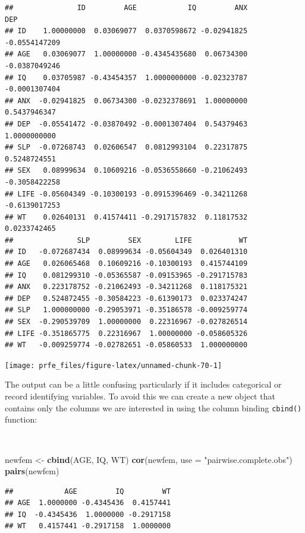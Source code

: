 \documentclass[12pt,a4paper]{book}
\newenvironment{Shaded}{\begin{snugshade}}{\end{snugshade}}
\newcommand{\KeywordTok}[1]{\textcolor[rgb]{0.13,0.29,0.53}{\textbf{#1}}}
\newcommand{\DataTypeTok}[1]{\textcolor[rgb]{0.13,0.29,0.53}{#1}}
\newcommand{\StringTok}[1]{\textcolor[rgb]{0.31,0.60,0.02}{#1}}
\newcommand{\NormalTok}[1]{#1}
\theoremstyle{definition}
\theoremstyle{definition}
\theoremstyle{definition}
\theoremstyle{remark}
\begin{document}
\begin{verbatim}
##               ID         AGE            IQ         ANX           DEP
## ID    1.00000000  0.03069077  0.0370598672 -0.02941825 -0.0554147209
## AGE   0.03069077  1.00000000 -0.4345435680  0.06734300 -0.0387049246
## IQ    0.03705987 -0.43454357  1.0000000000 -0.02323787 -0.0001307404
## ANX  -0.02941825  0.06734300 -0.0232378691  1.00000000  0.5437946347
## DEP  -0.05541472 -0.03870492 -0.0001307404  0.54379463  1.0000000000
## SLP  -0.07268743  0.02606547  0.0812993104  0.22317875  0.5248724551
## SEX   0.08999634  0.10609216 -0.0536558660 -0.21062493 -0.3058422258
## LIFE -0.05604349 -0.10300193 -0.0915396469 -0.34211268 -0.6139017253
## WT    0.02640131  0.41574411 -0.2917157832  0.11817532  0.0233742465
##               SLP         SEX        LIFE           WT
## ID   -0.072687434  0.08999634 -0.05604349  0.026401310
## AGE   0.026065468  0.10609216 -0.10300193  0.415744109
## IQ    0.081299310 -0.05365587 -0.09153965 -0.291715783
## ANX   0.223178752 -0.21062493 -0.34211268  0.118175321
## DEP   0.524872455 -0.30584223 -0.61390173  0.023374247
## SLP   1.000000000 -0.29053971 -0.35186578 -0.009259774
## SEX  -0.290539709  1.00000000  0.22316967 -0.027826514
## LIFE -0.351865775  0.22316967  1.00000000 -0.058605326
## WT   -0.009259774 -0.02782651 -0.05860533  1.000000000
\end{verbatim}

\newpage

\begin{center}\texttt{[image: prfe\_files/figure-latex/unnamed-chunk-70-1]} \end{center}

The output can be a little confusing particularly if it includes
categorical or record identifying variables. To avoid this we can create
a new object that contains only the columns we are interested in using
the column binding \texttt{cbind()} function:

~

\begin{Shaded}
\begin{Highlighting}[]
\NormalTok{newfem <-}\StringTok{ }\KeywordTok{cbind}\NormalTok{(AGE, IQ, WT)}
\KeywordTok{cor}\NormalTok{(newfem, }\DataTypeTok{use =} \StringTok{"pairwise.complete.obs"}\NormalTok{)}
\KeywordTok{pairs}\NormalTok{(newfem)}
\end{Highlighting}
\end{Shaded}

\begin{verbatim}
##            AGE         IQ         WT
## AGE  1.0000000 -0.4345436  0.4157441
## IQ  -0.4345436  1.0000000 -0.2917158
## WT   0.4157441 -0.2917158  1.0000000
\end{verbatim}
\end{document}
